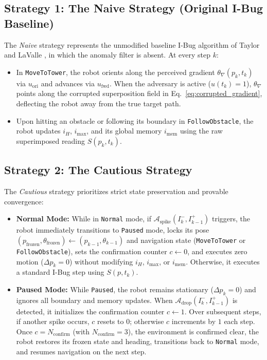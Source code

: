 \documentclass[12pt, a4paper]{article}
\begin{document}
\subsection{Strategy 1: The Naive Strategy (Original I-Bug Baseline)}
The \textit{Naive} strategy represents the unmodified baseline I-Bug algorithm of Taylor and LaValle \cite{taylor2014intensity}, in which the anomaly filter is absent. At every step $k$:
\begin{itemize}
    \item In \texttt{MoveToTower}, the robot orients along the perceived gradient $\theta_{\nabla}(p_k, t_k)$ via $u_{\text{ori}}$ and advances via $u_{\text{fwd}}$. When the adversary is active ($u(t_k)=1$), $\theta_{\nabla}$ points along the corrupted superposition field in Eq.~\eqref{eq:corrupted_gradient}, deflecting the robot away from the true target path.
    \item Upon hitting an obstacle or following its boundary in \texttt{FollowObstacle}, the robot updates $i_H$, $i_{\text{max}}$, and its global memory $i_{\text{mem}}$ using the raw superimposed reading $S(p_k, t_k)$.
\end{itemize}

\subsection{Strategy 2: The Cautious Strategy}
The \textit{Cautious} strategy prioritizes strict state preservation and provable convergence:
\begin{itemize}
    \item \textbf{Normal Mode:} While in \texttt{Normal} mode, if $\mathcal{A}_{\text{spike}}(I_k^-, I_{k-1}^+)$ triggers, the robot immediately transitions to \texttt{Paused} mode, locks its pose $(p_{\text{frozen}}, \theta_{\text{frozen}}) \leftarrow (p_{k-1}, \theta_{k-1})$ and navigation state (\texttt{MoveToTower} or \texttt{FollowObstacle}), sets the confirmation counter $c \leftarrow 0$, and executes zero motion ($\Delta p_k = 0$) without modifying $i_H$, $i_{\text{max}}$, or $i_{\text{mem}}$. Otherwise, it executes a standard I-Bug step using $S(p, t_k)$.
    \item \textbf{Paused Mode:} While \texttt{Paused}, the robot remains stationary ($\Delta p_k = 0$) and ignores all boundary and memory updates. When $\mathcal{A}_{\text{drop}}(I_k^-, I_{k-1}^+)$ is detected, it initializes the confirmation counter $c \leftarrow 1$. Over subsequent steps, if another spike occurs, $c$ resets to $0$; otherwise $c$ increments by $1$ each step. Once $c = N_{\text{confirm}}$ (with $N_{\text{confirm}} = 3$), the environment is confirmed clear, the robot restores its frozen state and heading, transitions back to \texttt{Normal} mode, and resumes navigation on the next step.
\end{itemize}
\end{document}
